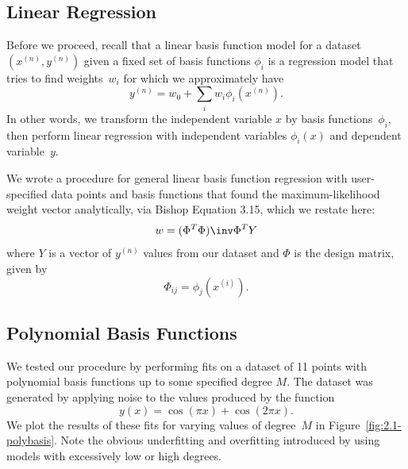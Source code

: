 \documentclass{article}
\begin{document}
\begin{multicols}{2}

\section{Linear Regression}

Before we proceed, recall that a linear basis function model for a dataset $(x^{(n)},y^{(n)})$ given a fixed set of basis functions $\phi_i$ is a regression model that tries to find weights~$w_i$ for which we approximately have
\[ y^{(n)} = w_0 + \sum_i w_i \phi_i(x^{(n)}). \]
In other words, we transform the independent variable $x$ by basis functions~$\phi_i$, then perform linear regression with independent variables $\phi_i(x)$ and dependent variable~$y$.

We wrote a procedure for general linear basis function regression with user-specified data points and basis functions that found the maximum-likelihood weight vector analytically, via Bishop Equation 3.15, which we restate here:
\begin{equation}
\label{eq:max-likelihood-weights}
w = (\Phi^T\Phi)\inv\Phi^T Y
\end{equation}
where $Y$ is a vector of $y^{(n)}$ values from our dataset and $\Phi$ is the design matrix, given by
\begin{equation}
\Phi_{ij} = \phi_j(x^{(i)}).
\end{equation}

\subsection{Polynomial Basis Functions}

We tested our procedure by performing fits on a dataset of 11 points with polynomial basis functions up to some specified degree $M$. The dataset was generated by applying noise to the values produced by the function
\begin{equation}
\label{eq:dataset-secret-func}
y(x) = \cos(\pi x) + \cos(2\pi x).
\end{equation}
We plot the results of these fits for varying values of degree~$M$ in Figure~\ref{fig:2.1-polybasis}. Note the obvious underfitting and overfitting introduced by using models with excessively low or high degrees.
\end{multicols}
\end{document}
